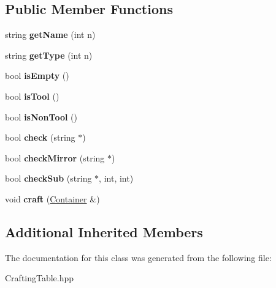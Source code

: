 \subsection*{Public Member Functions}
\begin{DoxyCompactItemize}
\item 
\mbox{\label{classCraftingTable_a36f5d86a261109862bfa7694eda5b184}} 
string {\bfseries get\+Name} (int n)
\item 
\mbox{\label{classCraftingTable_a9fdc40661df46962243650b87707efc9}} 
string {\bfseries get\+Type} (int n)
\item 
\mbox{\label{classCraftingTable_aa6c8c5a429043f061028ed71d355d135}} 
bool {\bfseries is\+Empty} ()
\item 
\mbox{\label{classCraftingTable_aa130ad45ab41cae52174f0acabfcb2e3}} 
bool {\bfseries is\+Tool} ()
\item 
\mbox{\label{classCraftingTable_ab96e041f3c9789c85cd5aca26dd0ae51}} 
bool {\bfseries is\+Non\+Tool} ()
\item 
\mbox{\label{classCraftingTable_a29f94729f67f3035649b3ae78e508997}} 
bool {\bfseries check} (string $\ast$)
\item 
\mbox{\label{classCraftingTable_af04bf32ed068072a41abb68d11b13672}} 
bool {\bfseries check\+Mirror} (string $\ast$)
\item 
\mbox{\label{classCraftingTable_a1e644f6269af59ae8315a2ca7fd651c0}} 
bool {\bfseries check\+Sub} (string $\ast$, int, int)
\item 
\mbox{\label{classCraftingTable_ab59eff677f8e20f5914f7308e4dfc28c}} 
void {\bfseries craft} (\hyperlink{classContainer}{Container} \&)
\end{DoxyCompactItemize}
\subsection*{Additional Inherited Members}


The documentation for this class was generated from the following file\+:\begin{DoxyCompactItemize}
\item 
Crafting\+Table.\+hpp\end{DoxyCompactItemize}
